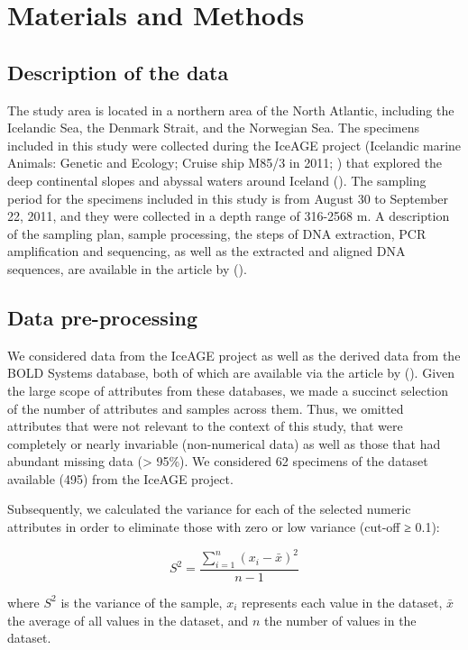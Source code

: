 \section{Materials and Methods}\label{materials-methods}

\subsection{Description of the data}
The study area is located in a northern area of the North Atlantic, including the Icelandic Sea, the Denmark Strait, and the Norwegian Sea. The specimens included in this study were collected during the IceAGE project (Icelandic marine Animals: Genetic and Ecology; Cruise ship M85/3 in 2011; \cite{brix_iceage_2014}) that explored the deep continental slopes and abyssal waters around Iceland (\cite{meisner_prefacebiodiversity_2018}). The sampling period for the specimens included in this study is from August 30 to September 22, 2011, and they were collected in a depth range of 316-2568 m. A description of the sampling plan, sample processing, the steps of DNA extraction, PCR amplification and sequencing, as well as the extracted and aligned DNA sequences, are available in the article by (\cite{uhlir_adding_2021}).

\subsection{Data pre-processing}
We considered data from the IceAGE project as well as the derived data from the BOLD Systems database, both of which are available via the article by (\cite{uhlir_adding_2021}). Given the large scope of attributes from these databases, we made a succinct selection of the number of attributes and samples across them. Thus, we omitted attributes that were not relevant to the context of this study, that were completely or nearly invariable (non-numerical data) as well as those that had abundant missing data (> 95\%). We considered 62 specimens of the dataset available (495) from the IceAGE project.

Subsequently, we calculated the variance for each of the selected numeric attributes in order to eliminate those with zero or low variance (cut-off ≥ 0.1):

\begin{equation}
S^2 = \frac{\sum_{i=1}^{n} (x_i - \bar{x})^2}{n-1}
\end{equation}

where \( S^2 \) is the variance of the sample, \( x_i \) represents each value in the dataset, \( \bar{x} \) the average of all values in the dataset, and \( n \) the number of values in the dataset.

